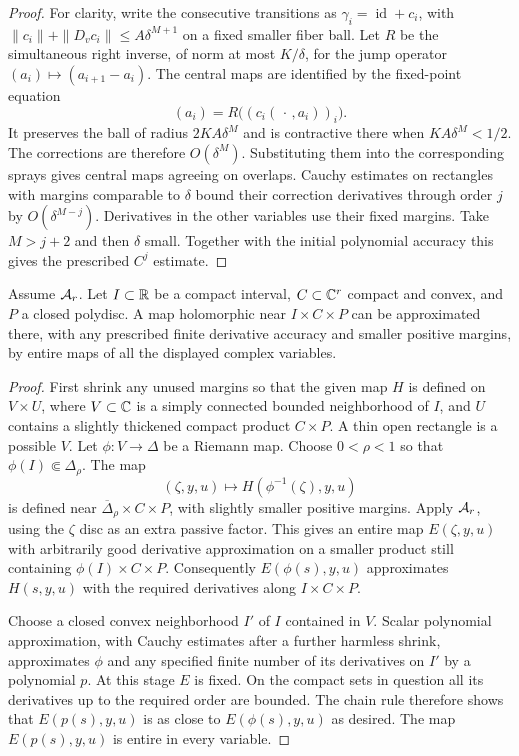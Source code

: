 \begin{proof}
For clarity, write the consecutive transitions as
$\gamma_i=\operatorname{id}+c_i$, with
$\|c_i\|+\|D_vc_i\|\le A\delta^{M+1}$ on a fixed smaller fiber ball.
Let $R$ be the simultaneous right inverse, of norm at most $K/\delta$,
for the jump operator $(a_i)\mapsto(a_{i+1}-a_i)$.
The central maps are identified by the fixed-point equation
\[
                 (a_i)=R\bigl((c_i(\,\cdot\,,a_i))_i\bigr).
\]
It preserves the ball of radius $2KA\delta^M$ and is contractive there
when $KA\delta^M<1/2$. The corrections are therefore $O(\delta^M)$.
Substituting them into the corresponding sprays gives central maps
agreeing on overlaps. Cauchy estimates on rectangles with margins
comparable to $\delta$ bound their correction derivatives through order
$j$ by $O(\delta^{M-j})$. Derivatives in the other variables use their
fixed margins. Take $M>j+2$ and then $\delta$ small. Together with the
initial polynomial accuracy this gives the prescribed $C^j$ estimate.
\end{proof}
\begin{lemma}\label{ana:parameter-disc}
Assume \({\cal A}_r\).  Let \(I\subset\mathbb R\) be a compact interval,
\(C\subset\mathbb C^r\) compact and convex, and \(P\) a closed polydisc.
A map holomorphic near \(I\times C\times P\) can be approximated
there, with any prescribed finite derivative accuracy and smaller
positive margins, by entire maps of all the displayed complex
variables.
\end{lemma}

\begin{proof}
First shrink any unused margins so that the given map \(H\) is
defined on \(V\times U\), where \(V\subset\mathbb C\) is a simply
connected bounded neighborhood of \(I\), and \(U\) contains a
slightly thickened compact product \(C\times P\).
A thin open rectangle is a possible \(V\).
Let \(\phi:V\to\Delta\) be a Riemann map.  Choose \(0<\rho<1\)
so that \(\phi(I)\Subset\Delta_\rho\).
The map
\[
 (\zeta,y,u)\longmapsto H(\phi^{-1}(\zeta),y,u)
\]
is defined near
\(\overline\Delta_\rho\times C\times P\), with slightly smaller
positive margins.  Apply \({\cal A}_r\), using the \(\zeta\)
disc as an extra passive factor.  This gives an entire map
\(E(\zeta,y,u)\) with arbitrarily good derivative approximation
on a smaller product still containing \(\phi(I)\times C\times P\).
Consequently \(E(\phi(s),y,u)\) approximates \(H(s,y,u)\) with
the required derivatives along \(I\times C\times P\).

Choose a closed convex neighborhood \(I'\) of \(I\) contained in
\(V\).  Scalar polynomial approximation, with Cauchy estimates
after a further harmless shrink, approximates \(\phi\) and any
specified finite number of its derivatives on \(I'\) by a
polynomial \(p\).  At this stage \(E\) is fixed.  On the compact
sets in question all its derivatives up to the required order
are bounded.  The chain rule therefore shows that
\(E(p(s),y,u)\) is as close to \(E(\phi(s),y,u)\) as desired.
The map \(E(p(s),y,u)\) is entire in every variable.
\end{proof}

